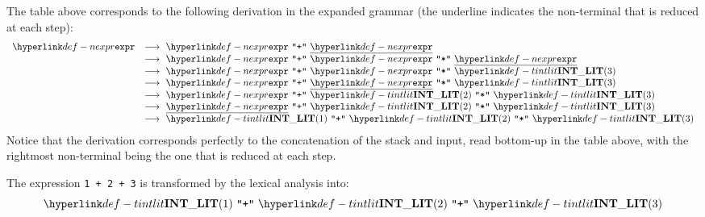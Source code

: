 The table above corresponds to the following derivation in the expanded grammar
(the underline indicates the non-terminal that is reduced at each step):
\[
\begin{array}{rl}
\Nexpr & \derives\ \Nexpr \parsesep \Tplus \parsesep \underline{\Nexpr}\\
       & \derives\ \Nexpr \parsesep \Tplus \parsesep \Nexpr \parsesep \Tmul \parsesep \underline{\Nexpr}\\
       & \derives\ \Nexpr \parsesep \Tplus \parsesep \Nexpr \parsesep \Tmul \parsesep \Tintlit(3)\\
       & \derives\ \Nexpr \parsesep \Tplus \parsesep \underline{\Nexpr} \parsesep \Tmul \parsesep \Tintlit(3)\\
       & \derives\ \Nexpr \parsesep \Tplus \parsesep \Tintlit(2) \parsesep \Tmul \parsesep \Tintlit(3)\\
       & \derives\ \underline{\Nexpr} \parsesep \Tplus \parsesep \Tintlit(2) \parsesep \Tmul \parsesep \Tintlit(3)\\
       & \derives\ \Tintlit(1) \parsesep \Tplus \parsesep \Tintlit(2) \parsesep \Tmul \parsesep \Tintlit(3)\\
\end{array}
\]
Notice that the derivation corresponds perfectly to the concatenation of the stack
and input, read bottom-up in the table above, with the rightmost non-terminal
being the one that is reduced at each step.

The expression \texttt{1 + 2 + 3}
is transformed by the lexical analysis into:
\[
\Tintlit(1) \parsesep \Tplus \parsesep \Tintlit(2) \parsesep \Tplus \parsesep \Tintlit(3)
\]

